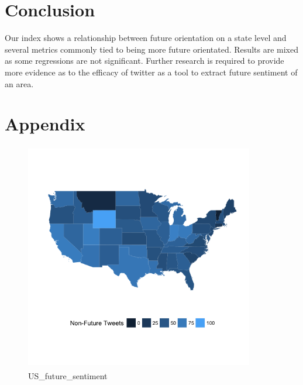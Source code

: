 \documentclass{article}
\begin{document}
\section{Conclusion}

Our index shows a relationship between future orientation on a state level and several metrics commonly tied to being more future orientated. Results are mixed as some regressions are not significant. Further research is required to provide more evidence as to the efficacy of twitter as a tool to extract future sentiment of an area. 

\pagebreak{}




\pagebreak{}
\section{Appendix}

\begin{figure}[h!]
\centering
\includegraphics[width=10cm,height=10cm]{Non_future_tweets.png}
    \caption{US_future_sentiment}
\end{figure}
\end{document}
